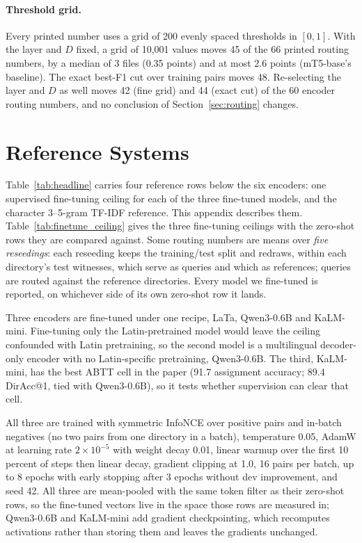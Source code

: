 \documentclass[11pt]{article}
\begin{document}
\paragraph{Threshold grid.} Every printed number uses a grid of 200 evenly spaced thresholds in $[0,1]$. With the layer and $D$ fixed, a grid of 10,001 values moves 45 of the 66 printed routing numbers, by a median of 3 files (0.35 points) and at most 2.6 points (mT5-base's baseline). The exact best-F1 cut over training pairs moves 48. Re-selecting the layer and $D$ as well moves 42 (fine grid) and 44 (exact cut) of the 60 encoder routing numbers, and no conclusion of Section~\ref{sec:routing} changes.





\FloatBarrier
\section{Reference Systems}
\label{app:reference_systems}

Table~\ref{tab:headline} carries four reference rows below the six encoders: one supervised fine-tuning ceiling for each of the three fine-tuned models, and the character 3--5-gram TF-IDF reference.
This appendix describes them.
Table~\ref{tab:finetune_ceiling} gives the three fine-tuning ceilings with the zero-shot rows they are compared against.
Some routing numbers are means over \emph{five reseedings}: each reseeding keeps the training/test split and redraws, within each directory's test witnesses, which serve as queries and which as references; queries are routed against the reference directories.
Every model we fine-tuned is reported, on whichever side of its own zero-shot row it lands.

Three encoders are fine-tuned under one recipe, LaTa, Qwen3-0.6B and KaLM-mini. Fine-tuning only the Latin-pretrained model would leave the ceiling confounded with Latin pretraining, so the second model is a multilingual decoder-only encoder with no Latin-specific pretraining, Qwen3-0.6B. The third, KaLM-mini, has the best ABTT cell in the paper (91.7 assignment accuracy; 89.4 DirAcc@1, tied with Qwen3-0.6B), so it tests whether supervision can clear that cell.

All three are trained with symmetric InfoNCE over positive pairs and in-batch negatives (no two pairs from one directory in a batch), temperature 0.05, AdamW at learning rate $2\times10^{-5}$ with weight decay 0.01, linear warmup over the first 10 percent of steps then linear decay, gradient clipping at 1.0, 16 pairs per batch, up to 8 epochs with early stopping after 3 epochs without dev improvement, and seed 42. All three are mean-pooled with the same token filter as their zero-shot rows, so the fine-tuned vectors live in the space those rows are measured in; Qwen3-0.6B and KaLM-mini add gradient checkpointing, which recomputes activations rather than storing them and leaves the gradients unchanged.
\end{document}
